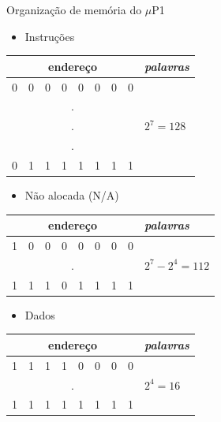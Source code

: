\documentclass[aspectratio=169]{beamer}
\begin{document}
\begin{frame}{Organização de memória do $\mu$P1}
    \begin{multicols}{2}
    \begin{itemize}
        \item Instruções
    \end{itemize}    
    \begin{tabular}{ccccccccl}
        \hline
         \multicolumn{8}{c}{endereço} & \textit{palavras} \\
         \hline
         \hline
        0 & 0 & 0 & 0 & 0 & 0 & 0 & 0 & \multirow{5}{*}{$2^{7} = 128$} \\
        \multicolumn{8}{c}{.} \\
        \multicolumn{8}{c}{.} \\
        \multicolumn{8}{c}{.} \\
        0 & 1 & 1 & 1 & 1 & 1 & 1 & 1 &  \\
        \hline
    \end{tabular}
    \vfill\null
    \columnbreak
    \begin{itemize}
        \item Não alocada (N/A)
    \end{itemize}    
    \begin{tabular}{ccccccccl}
        \hline
         \multicolumn{8}{c}{endereço} & \textit{palavras} \\
         \hline
         \hline
        1 & 0 & 0 & 0 & 0 & 0 & 0 & 0 & \multirow{3}{*}{$2^{7} - 2^{4} = 112$} \\
        \multicolumn{8}{c}{.} \\
        1 & 1 & 1 & 0 & 1 & 1 & 1 & 1 &  \\
        \hline
    \end{tabular}
    \begin{itemize}
        \item Dados
    \end{itemize}    
    \begin{tabular}{ccccccccl}
        \hline
         \multicolumn{8}{c}{endereço} & \textit{palavras} \\
         \hline
         \hline
        1 & 1 & 1 & 1 & 0 & 0 & 0 & 0 & \multirow{3}{*}{$2^{4} = 16$} \\
        \multicolumn{8}{c}{.} \\
        1 & 1 & 1 & 1 & 1 & 1 & 1 & 1 &  \\
        \hline
    \end{tabular}    \end{multicols}
\end{frame}
\end{document}
